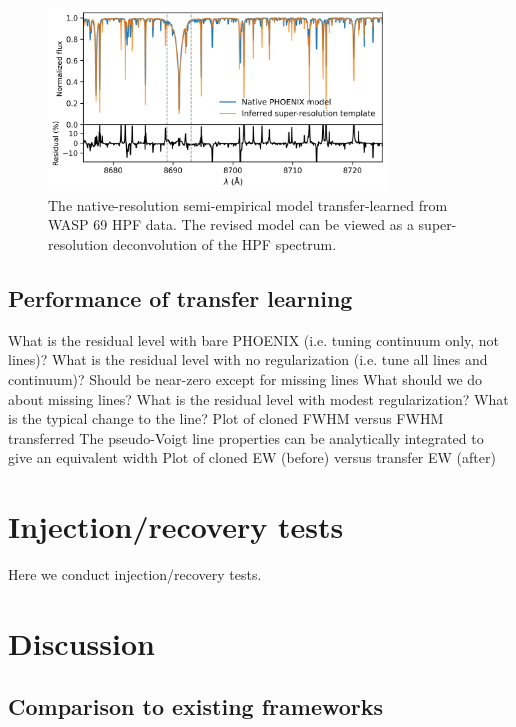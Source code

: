\documentclass[modern]{aastex631}
\begin{document}
\begin{figure}[hbt!]
    \centering
    \includegraphics[width=0.8\textwidth]{figures/blase_super_resolution_template.png}
    \caption{The native-resolution semi-empirical model transfer-learned from WASP 69 HPF data. The revised model can be viewed as a super-resolution deconvolution of the HPF spectrum.}
    \label{fig_WASP69_regularized}
\end{figure}

\subsection{Performance of transfer learning}


\begin{outline}
    \1 What is the residual level with bare PHOENIX (i.e. tuning continuum only, not lines)?
    \1 What is the residual level with no regularization (i.e. tune all lines and continuum)?
    \2 Should be near-zero except for missing lines
    \2 What should we do about missing lines?
    \1 What is the residual level with modest regularization? What is the typical change to the line?
    \2 Plot of cloned FWHM versus FWHM transferred
    \2 The pseudo-Voigt line properties can be analytically integrated to give an equivalent width
    \2 Plot of cloned EW (before) versus transfer EW (after)
\end{outline}

\section{Injection/recovery tests}\label{secInjRec}
Here we conduct injection/recovery tests.

\section{Discussion}\label{secDiscuss}

\subsection{Comparison to existing frameworks}
\end{document}
